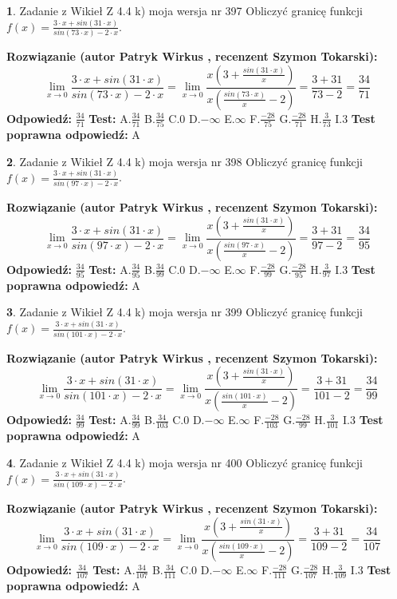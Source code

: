 \documentclass[12pt, a4paper]{article}
\theoremstyle{definition} %
\newtheorem{zad}{}
\newcommand{\zadStart}[1]{\begin{zad}#1\newline}
\newcommand{\zadStop}{\end{zad}}
\newcommand{\rozwStart}[2]{\noindent \textbf{Rozwiązanie (autor #1 , recenzent #2): }\newline}
\newcommand{\rozwStop}{\newline}
\newcommand{\odpStart}{\noindent \textbf{Odpowiedź:}\newline}
\newcommand{\odpStop}{\newline}
\newcommand{\testStart}{\noindent \textbf{Test:}\newline}
\newcommand{\testStop}{\newline}
\newcommand{\kluczStart}{\noindent \textbf{Test poprawna odpowiedź:}\newline}
\newcommand{\kluczStop}{\newline}
\begin{document}
\zadStart{Zadanie z Wikieł Z 4.4 k) moja wersja nr 397}
Obliczyć granicę funkcji $f(x)=\frac{3\cdot x +sin(31\cdot x)}{sin(73\cdot x) -2\cdot x}$.
\zadStop
\rozwStart{Patryk Wirkus}{Szymon Tokarski}
$$\lim\limits_{x\to 0}\frac{3\cdot x +sin(31\cdot x)}{sin(73\cdot x) -2\cdot x}
=\lim\limits_{x\to 0}\frac{x(3+\frac{sin(31\cdot x)}{x})}{x(\frac{sin(73\cdot x)}{x}-2)}
=\frac{3+31}{73-2} = \frac{34}{71}$$
\rozwStop
\odpStart
$\frac{34}{71}$
\odpStop
\testStart
A.$\frac{34}{71}$
B.$\frac{34}{75}$
C.$0$
D.$-\infty$
E.$\infty$
F.$\frac{-28}{75}$
G.$\frac{-28}{71}$
H.$\frac{3}{73}$
I.$3$
\testStop
\kluczStart
A
\kluczStop



\zadStart{Zadanie z Wikieł Z 4.4 k) moja wersja nr 398}
Obliczyć granicę funkcji $f(x)=\frac{3\cdot x +sin(31\cdot x)}{sin(97\cdot x) -2\cdot x}$.
\zadStop
\rozwStart{Patryk Wirkus}{Szymon Tokarski}
$$\lim\limits_{x\to 0}\frac{3\cdot x +sin(31\cdot x)}{sin(97\cdot x) -2\cdot x}
=\lim\limits_{x\to 0}\frac{x(3+\frac{sin(31\cdot x)}{x})}{x(\frac{sin(97\cdot x)}{x}-2)}
=\frac{3+31}{97-2} = \frac{34}{95}$$
\rozwStop
\odpStart
$\frac{34}{95}$
\odpStop
\testStart
A.$\frac{34}{95}$
B.$\frac{34}{99}$
C.$0$
D.$-\infty$
E.$\infty$
F.$\frac{-28}{99}$
G.$\frac{-28}{95}$
H.$\frac{3}{97}$
I.$3$
\testStop
\kluczStart
A
\kluczStop



\zadStart{Zadanie z Wikieł Z 4.4 k) moja wersja nr 399}
Obliczyć granicę funkcji $f(x)=\frac{3\cdot x +sin(31\cdot x)}{sin(101\cdot x) -2\cdot x}$.
\zadStop
\rozwStart{Patryk Wirkus}{Szymon Tokarski}
$$\lim\limits_{x\to 0}\frac{3\cdot x +sin(31\cdot x)}{sin(101\cdot x) -2\cdot x}
=\lim\limits_{x\to 0}\frac{x(3+\frac{sin(31\cdot x)}{x})}{x(\frac{sin(101\cdot x)}{x}-2)}
=\frac{3+31}{101-2} = \frac{34}{99}$$
\rozwStop
\odpStart
$\frac{34}{99}$
\odpStop
\testStart
A.$\frac{34}{99}$
B.$\frac{34}{103}$
C.$0$
D.$-\infty$
E.$\infty$
F.$\frac{-28}{103}$
G.$\frac{-28}{99}$
H.$\frac{3}{101}$
I.$3$
\testStop
\kluczStart
A
\kluczStop



\zadStart{Zadanie z Wikieł Z 4.4 k) moja wersja nr 400}
Obliczyć granicę funkcji $f(x)=\frac{3\cdot x +sin(31\cdot x)}{sin(109\cdot x) -2\cdot x}$.
\zadStop
\rozwStart{Patryk Wirkus}{Szymon Tokarski}
$$\lim\limits_{x\to 0}\frac{3\cdot x +sin(31\cdot x)}{sin(109\cdot x) -2\cdot x}
=\lim\limits_{x\to 0}\frac{x(3+\frac{sin(31\cdot x)}{x})}{x(\frac{sin(109\cdot x)}{x}-2)}
=\frac{3+31}{109-2} = \frac{34}{107}$$
\rozwStop
\odpStart
$\frac{34}{107}$
\odpStop
\testStart
A.$\frac{34}{107}$
B.$\frac{34}{111}$
C.$0$
D.$-\infty$
E.$\infty$
F.$\frac{-28}{111}$
G.$\frac{-28}{107}$
H.$\frac{3}{109}$
I.$3$
\testStop
\kluczStart
A
\kluczStop
\end{document}
